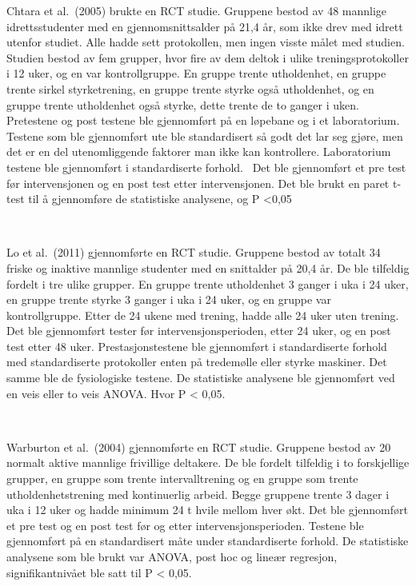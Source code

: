 \documentclass[
]{article}
\begin{document}
Chtara et al.~(2005) brukte en RCT studie. Gruppene bestod av 48
mannlige idrettsstudenter med en gjennomsnittsalder på 21,4 år, som ikke
drev med idrett utenfor studiet. Alle hadde sett protokollen, men ingen
visste målet med studien. Studien bestod av fem grupper, hvor fire av
dem deltok i ulike treningsprotokoller i 12 uker, og en var
kontrollgruppe. En gruppe trente utholdenhet, en gruppe trente sirkel
styrketrening, en gruppe trente styrke også utholdenhet, og en gruppe
trente utholdenhet også styrke, dette trente de to ganger i uken.
Pretestene og post testene ble gjennomført på en løpebane og i et
laboratorium. Testene som ble gjennomført ute ble standardisert så godt
det lar seg gjøre, men det er en del utenomliggende faktorer man ikke
kan kontrollere. Laboratorium testene ble gjennomført i standardiserte
forhold. ~Det ble gjennomført et pre test før intervensjonen og en post
test etter intervensjonen. Det ble brukt en paret t-test til å
gjennomføre de statistiske analysene, og P \textless0,05

~

Lo et al.~(2011) gjennomførte en RCT studie. Gruppene bestod av totalt
34 friske og inaktive mannlige studenter med en snittalder på 20,4 år.
De ble tilfeldig fordelt i tre ulike grupper. En gruppe trente
utholdenhet 3 ganger i uka i 24 uker, en gruppe trente styrke 3 ganger i
uka i 24 uker, og en gruppe var kontrollgruppe. Etter de 24 ukene med
trening, hadde alle 24 uker uten trening. Det ble gjennomført tester før
intervensjonsperioden, etter 24 uker, og en post test etter 48 uker.
Prestasjonstestene ble gjennomført i standardiserte forhold med
standardiserte protokoller enten på tredemølle eller styrke maskiner.
Det samme ble de fysiologiske testene. De statistiske analysene ble
gjennomført ved en veis eller to veis ANOVA. Hvor P \textless{} 0,05.

~

Warburton et al.~(2004) gjennomførte en RCT studie. Gruppene bestod av
20 normalt aktive mannlige frivillige deltakere. De ble fordelt
tilfeldig i to forskjellige grupper, en gruppe som trente
intervalltrening og en gruppe som trente utholdenhetstrening med
kontinuerlig arbeid. Begge gruppene trente 3 dager i uka i 12 uker og
hadde minimum 24 t hvile mellom hver økt. Det ble gjennomført et pre
test og en post test før og etter intervensjonsperioden. Testene ble
gjennomført på en standardisert måte under standardiserte forhold. De
statistiske analysene som ble brukt var ANOVA, post hoc og lineær
regresjon, signifikantnivået ble satt til P \textless{} 0,05.
\end{document}
